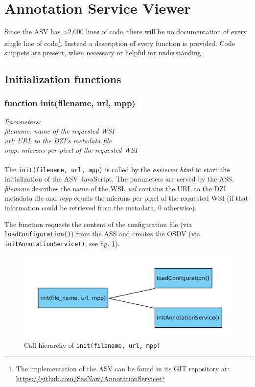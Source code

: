 \section{Annotation Service Viewer}
\label{sec_B2}

Since the ASV has \textgreater 2,000 lines of code, there will be no documentation of every single line of code\footnote{
	The implementation of the ASV can be found in its GIT repository at: \url{https://github.com/SasNaw/AnnotationService}
}. Instead a description of every function is provided. Code snippets are present, when necessary or helpful for understanding.


\subsection{Initialization functions}

\subsubsection{function init(file{\textunderscore}name, url, mpp)}
\emph{Parameters:\\
	file{\textunderscore}name: name of the requested WSI\\
	url: URL to the DZI's metadata file\\
	mpp: microns per pixel of the requested WSI\\ \\
}
The \texttt{init(file{\textunderscore}name, url, mpp)} is called by the \emph{as{\textunderscore}viewer.html} to start the initialization of the ASV JavaScript. The parameters are served by the ASS. \emph{file{\textunderscore}name} describes the name of the WSI, \emph{url} contains the URL to the DZI metadata file and \emph{mpp} equals the microns per pixel of the requested WSI (if that information could be retrieved from the metadata, 0 otherwise).

The function requests the content of the configuration file (via \texttt{loadConfiguration()}) from the ASS and creates the OSDV (via \texttt{initAnnotationService()}, see fig. \ref{figB_init}).

\begin{figure}[H]
	\begin{center}
		\includegraphics[scale=0.5]{img/ch_init.png}
		\caption{Call hierarchy of \texttt{init(file{\textunderscore}name, url, mpp)}}
		\label{figB_init}
	\end{center}
\end{figure}


